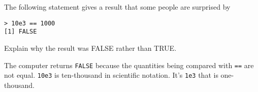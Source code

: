 
The following statement gives a result that some people are surprised by
\begin{verbatim}
> 10e3 == 1000
[1] FALSE
\end{verbatim}
Explain why the result was FALSE rather than TRUE.

\begin{MultipleChoice}
\end{MultipleChoice}

\begin{AnswerText}
The computer returns \texttt{FALSE} because the quantities being
compared with \texttt{==} are not equal. \texttt{10e3} is ten-thousand
in scientific notation.  It's \texttt{1e3} that is one-thousand.
\end{AnswerText}

